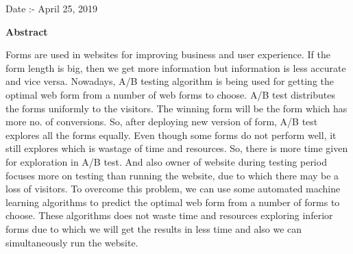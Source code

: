 \documentclass[12pt]{report}
\begin{document}
\newline
\newline
\newline
\newline
Date :-  April 25, 2019
\newpage
\begin{center}
\begin{Huge}
\textbf{ Abstract }
\end{Huge}
\end{center}
\vspace*{50px}
Forms are used in websites for improving business and user experience\cite{krug2000don}. If the form length is big, then we get more information but information is less accurate and vice versa. Nowadays, A/B testing algorithm is being used for getting the optimal web form from a number of web forms to choose. A/B test distributes the forms uniformly to the visitors. The winning form will be the form which has more no. of conversions. So, after deploying new version of form, A/B test explores all the forms equally\cite{cruz2018enabling}. Even though some forms do not perform well, it still explores which is wastage of time and resources. So, there is more time given for exploration in A/B test. And also owner of website during testing period focuses more on testing than running the website, due to which there may be a loss of visitors. 
To overcome this problem, we can use some automated machine learning algorithms to predict the optimal web form from a number of forms to choose. These algorithms does not waste time and resources exploring inferior forms due to which we will get the results in less time and also we can simultaneously run the website.
\end{document}
